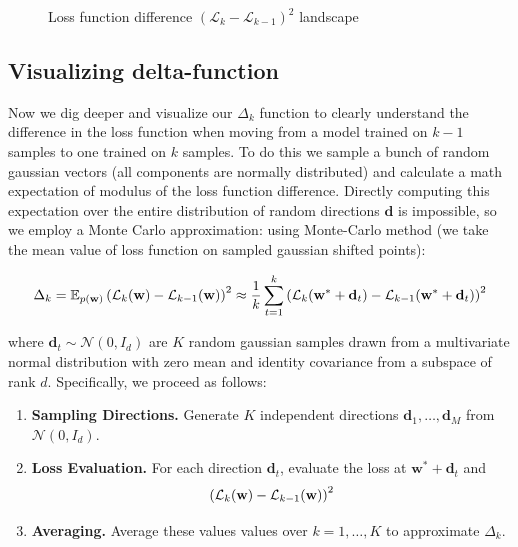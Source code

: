 \documentclass{article}
\begin{document}
\begin{figure}[!htbp]
  \hspace*{-11.5cm}
  \caption{Loss function difference $(\mathcal{L}_{k} - \mathcal{L}_{k-1})^2$ landscape}
  \label{fig:base_loss_diff}
\end{figure}

\subsection{Visualizing delta-function}

Now we dig deeper and visualize our $\Delta_k$ function to clearly understand the difference in the loss function when
moving from a model trained on $k-1$ samples to one trained on $k$ samples. To do this we sample a bunch of random gaussian
vectors (all components are normally distributed) and calculate a
math expectation of modulus of the loss function difference.
Directly computing this expectation over the entire distribution of random directions $\mathbf{d}$
is impossible, so we employ a Monte Carlo approximation: using Monte-Carlo method (we take the mean value of loss function
on sampled gaussian shifted points):

$$\Delta_k = \mathbb{E}_{p(\mathbf{w})} \left( \mathcal{L}_{k}(\mathbf{w}) - \mathcal{L}_{k-1}(\mathbf{w}) \right)^2 \approx
  \frac{1}{k} \sum_{t=1}^{k} \left( \mathcal{L}_k(\mathbf{w}^* + \mathbf{d}_t) - \mathcal{L}_{k-1}(\mathbf{w}^* + \mathbf{d}_t) \right)^2$$

where $\mathbf{d}_t \sim \mathcal{N}(0,I_d)$ are $K$ random gaussian samples drawn from a multivariate normal distribution
with zero mean and identity covariance from a subspace of rank $d$. Specifically, we proceed as follows:

\begin{enumerate}
  \item \textbf{Sampling Directions.} Generate $K$ independent directions $\mathbf{d}_1, \dots, \mathbf{d}_M$
        from $\mathcal{N}(0,I_d)$.
  \item \textbf{Loss Evaluation.} For each direction $\mathbf{d}_t$, evaluate the loss at
        $\mathbf{w}^* + \mathbf{d}_t$ and
        $$\left( \mathcal{L}_{k}(\mathbf{w}) - \mathcal{L}_{k-1}(\mathbf{w}) \right)^2 $$
  \item \textbf{Averaging.} Average these values values over $k = 1, \dots, K$ to approximate $\Delta_k$.
\end{enumerate}
\end{document}
